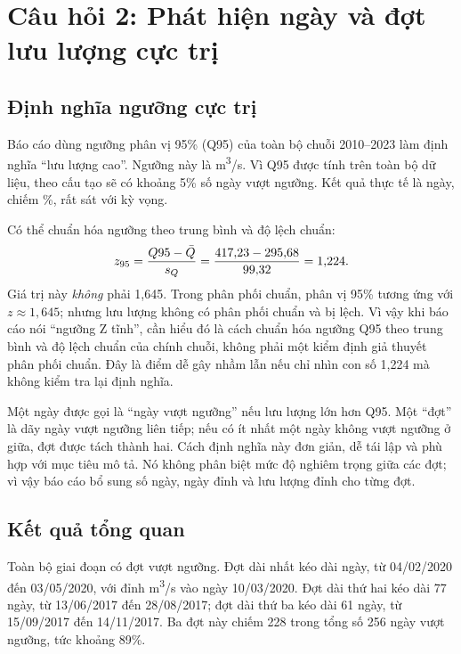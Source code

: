 \section{Câu hỏi 2: Phát hiện ngày và đợt lưu lượng cực trị}
\label{sec:q2}

\subsection{Định nghĩa ngưỡng cực trị}

Báo cáo dùng ngưỡng phân vị 95\% (Q95) của toàn bộ chuỗi 2010--2023 làm định nghĩa
“lưu lượng cao”. Ngưỡng này là \QHigh{} m\textsuperscript{3}/s. Vì Q95 được tính trên
toàn bộ dữ liệu, theo cấu tạo sẽ có khoảng 5\% số ngày vượt ngưỡng. Kết quả thực tế
là \NDaysHigh{} ngày, chiếm \ShareHigh{}\%, rất sát với kỳ vọng.

Có thể chuẩn hóa ngưỡng theo trung bình và độ lệch chuẩn:
\[
z_{95} = \frac{Q95-\bar{Q}}{s_Q}
= \frac{417{,}23-295{,}68}{99{,}32}
= 1{,}224.
\]
Giá trị này \emph{không} phải 1,645. Trong phân phối chuẩn, phân vị 95\% tương ứng
với $z \approx 1,645$; nhưng lưu lượng không có phân phối chuẩn và bị lệch. Vì vậy
khi báo cáo nói “ngưỡng Z tĩnh”, cần hiểu đó là cách chuẩn hóa ngưỡng Q95 theo
trung bình và độ lệch chuẩn của chính chuỗi, không phải một kiểm định giả thuyết
phân phối chuẩn. Đây là điểm dễ gây nhầm lẫn nếu chỉ nhìn con số 1,224 mà không
kiểm tra lại định nghĩa.

Một ngày được gọi là “ngày vượt ngưỡng” nếu lưu lượng lớn hơn Q95. Một “đợt” là
dãy ngày vượt ngưỡng liên tiếp; nếu có ít nhất một ngày không vượt ngưỡng ở giữa,
đợt được tách thành hai. Cách định nghĩa này đơn giản, dễ tái lập và phù hợp với
mục tiêu mô tả. Nó không phân biệt mức độ nghiêm trọng giữa các đợt; vì vậy báo cáo
bổ sung số ngày, ngày đỉnh và lưu lượng đỉnh cho từng đợt.

\subsection{Kết quả tổng quan}

Toàn bộ giai đoạn có \NEvents{} đợt vượt ngưỡng. Đợt dài nhất kéo dài
\LongestEvent{} ngày, từ 04/02/2020 đến 03/05/2020, với đỉnh \QMax{}
m\textsuperscript{3}/s vào ngày 10/03/2020. Đợt dài thứ hai kéo dài 77 ngày, từ
13/06/2017 đến 28/08/2017; đợt dài thứ ba kéo dài 61 ngày, từ 15/09/2017 đến
14/11/2017. Ba đợt này chiếm 228 trong tổng số 256 ngày vượt ngưỡng, tức khoảng
89\%.

\begin{table}[H]
\centering
\small

\caption{Năm đợt lưu lượng cao dài nhất. Danh sách đầy đủ 15 đợt nằm ở phụ lục.}
\label{tab:top-events}
\end{table}

